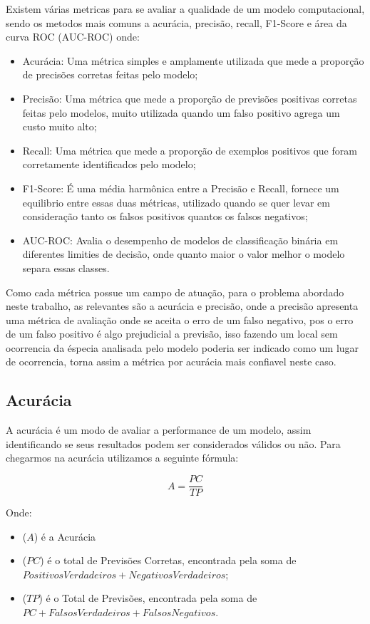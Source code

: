 \documentclass[
	12pt,				%
	openright,			%
	oneside,			%
	a4paper,			%
	english,			%
	brazil				%
	]{abntex2}
\begin{document}
Existem várias metricas para se avaliar a qualidade de um modelo computacional, sendo os metodos mais
comuns a acurácia, precisão, recall, F1-Score e área da curva ROC (AUC-ROC) \cite{metricas_aval_modelo} onde:

\begin{itemize}
	\item Acurácia: Uma métrica simples e amplamente utilizada que mede a proporção de precisões corretas feitas pelo modelo;
	\item Precisão: Uma métrica que mede a proporção de previsões positivas corretas feitas pelo modelos, muito utilizada 
	quando um falso positivo agrega um custo muito alto;
	\item Recall: Uma métrica que mede a proporção de exemplos positivos que foram corretamente identificados pelo modelo;
	\item F1-Score: É uma média harmônica entre a Precisão e Recall, fornece um equilibrio entre essas duas métricas, utilizado
	quando se quer levar em consideração tanto os falsos positivos quantos os falsos negativos;
	\item AUC-ROC: Avalia o desempenho de modelos de classificação binária em diferentes limities de decisão, onde quanto
	maior o valor melhor o modelo separa essas classes.
\end{itemize}

Como cada métrica possue um campo de atuação, para o problema abordado neste trabalho, as relevantes são a acurácia e precisão,
onde a precisão apresenta uma métrica de avaliação onde se aceita o erro de um falso negativo, pos o erro de um falso positivo
é algo prejudicial a previsão, isso fazendo um local sem ocorrencia da éspecia analisada pelo modelo poderia ser indicado como 
um lugar de ocorrencia, torna assim a métrica por acurácia mais confiavel neste caso.

\subsection{Acurácia}

A acurácia é um modo de avaliar a performance de um modelo, assim identificando se seus resultados podem
ser considerados válidos ou não. Para chegarmos na acurácia utilizamos a seguinte fórmula:

\begin{equation}
	\label{conta_acuracia}
	A = \frac{PC}{TP}
\end{equation}

Onde:
\begin{itemize}
	\item ($A$) é a Acurácia
	\item ($PC$) é o total de Previsões Corretas, encontrada pela soma de $Positivos Verdadeiros + Negativos Verdadeiros$;
	\item ($TP$) é o Total de Previsões, encontrada pela soma de $PC + Falsos Verdadeiros + Falsos Negativos$.
\end{itemize}
\end{document}
